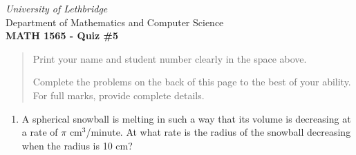 \documentclass[12pt]{article}
\newcommand{\skipline}{\vspace{12pt}}
\begin{document}
\thispagestyle{empty}
\begin{center}
\emph{University of Lethbridge}\\
Department of Mathematics and Computer Science\\
{\bf MATH 1565 - Quiz \#5}\\
\end{center}



\vspace{0.1in}

\vspace*{\fill}

\begin{quote}
Print your name and student number clearly in the space above. 

\medskip

Complete the problems on the back of this page to the best of your ability.
For full marks, provide complete details.

\medskip

\end{quote}
\newpage
\thispagestyle{empty}
\begin{enumerate}
 \item A spherical snowball is melting in such a way that its volume is decreasing 
 at a rate of $\pi$ $\text{cm}^3$/minute. At what rate is the radius of the snowball decreasing when 
 the radius is 10 cm?
 
 
 
%  
 
 \end{enumerate}
\end{document}
